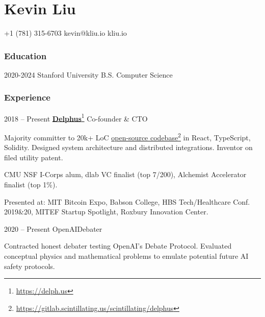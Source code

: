 \documentclass[paper=letter]{tccv}
\newcommand{\myhref}[2]{\href{#1}{#2}\footnote{\url{#1}}}
\begin{document}
\part{Kevin Liu}

 {+1 (781) 315-6703}
    {kevin@kliu.io} {kliu.io}

\section{Education}

\begin{yearlist}
     \item{2020-2024}
          {Stanford University} {B.S. Computer Science}
\end{yearlist}

\section{Experience}

\begin{eventlist}

\item{2018 -- Present}
     {\myhref{https://delph.us}{\textbf{Delphus}}} {Co-founder \& CTO}
\end{eventlist}

\vspace{-0.75cm}

Majority committer to 20k+ LoC
\myhref{https://gitlab.scintillating.us/scintillating/delphus}{open-source codebase} in React, TypeScript, Solidity. Designed system architecture and
distributed integrations. Inventor on filed utility patent.

CMU NSF I-Corps alum, dlab VC finalist (top 7/200), Alchemist Accelerator
     finalist (top 1\%).

Presented at: MIT Bitcoin Expo, Babson College, HBS Tech/Healthcare Conf.
     2019\&20, MITEF Startup Spotlight, Roxbury Innovation Center.

\begin{eventlist}
    \item{2020 -- Present}
         {OpenAI}{Debater}

    \vspace{-0.3cm}
    Contracted honest debater testing OpenAI's Debate Protocol. Evaluated
    conceptual physics and mathematical problems to emulate potential future AI
    safety protocols.
\end{eventlist}
\end{document}
